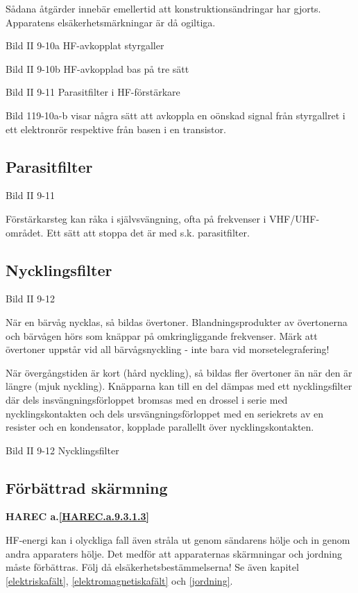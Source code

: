 Sådana åtgärder innebär emellertid att konstruktionsändringar har
gjorts. Apparatens elsäkerhetsmärkningar är då ogiltiga.

Bild II 9-10a HF-avkopplat styrgaller

Bild II 9-10b HF-avkopplad bas på tre sätt

Bild II 9-11 Parasitfilter i HF-förstärkare

Bild 119-10a-b visar några sätt att avkoppla en oönskad signal från
styrgallret i ett elektronrör respektive från basen i en transistor.

\subsection{Parasitfilter}

Bild II 9-11

Förstärkarsteg kan råka i självsvängning, ofta på frekvenser i
VHF/UHF-området. Ett sätt att stoppa det är med s.k. parasitfilter.

\subsection{Nycklingsfilter}

Bild II 9-12

När en bärvåg nycklas, så bildas övertoner.  Blandningsprodukter av
övertonerna och bärvågen hörs som knäppar på omkringliggande
frekvenser. Märk att övertoner uppstår vid all bärvågsnyckling - inte
bara vid morsetelegrafering!

När övergångstiden är kort (hård nyckling), så bildas fler övertoner
än när den är längre (mjuk nyckling). Knäpparna kan till en del dämpas
med ett nycklingsfilter där dels insvängningsförloppet bromsas med en
drossel i serie med nycklingskontakten och dels ursvängningsförloppet
med en seriekrets av en resister och en kondensator, kopplade
parallellt över nycklingskontakten.

Bild II 9-12 Nycklingsfilter

\subsection{Förbättrad skärmning}
\textbf{
HAREC a.\ref{HAREC.a.9.3.1.3}\label{myHAREC.a.9.3.1.3}
}

HF-energi kan i olyckliga fall även stråla ut genom sändarens hölje
och in genom andra apparaters hölje. Det medför att apparaternas
skärmningar och jordning måste förbättras. Följ då
elsäkerhetsbestämmelserna!  Se även kapitel \ref{elektriskafält},
\ref{elektromagnetiskafält} och \ref{jordning}.
